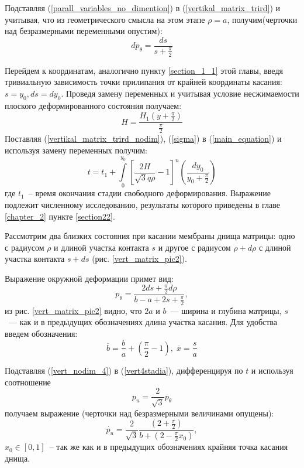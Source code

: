 Подставляя (\ref{parall_variables_no_dimention}) в (\ref{vertikal_matrix_trird}) и учитывая, что из геометрического смысла на этом этапе $\rho = a$, получим(черточки над безразмерными переменными опустим):
	\begin{equation}
	dp_\theta = \dfrac{ds}{s+\frac{\pi}{2}}
	\label{vertikal_matrix_trird_nodim}
	\end{equation}

Перейдем к координатам, аналогично пункту \ref{section_1_1} этой главы, введя тривиальную зависимость точки прилипания от крайней координаты касания: $s=y_0, ds = dy_0$.
Проведя замену переменных и учитывая условие несжимаемости плоского деформированного состояния получаем:
	\begin{equation}
	H=\dfrac{H_1(y+\frac{\pi}{2})}{\frac{\pi}{2}}
	\end{equation}
Поставляя (\ref{vertikal_matrix_trird_nodim}), (\ref{sigma}) в (\ref{main_equation}) и используя замену переменных получим:
\begin{equation}
t = t_1 + \int\limits_0^{y_0}\left[ \dfrac{2H}{\sqrt3 q \rho} -1\right]^n\left(\dfrac{dy_0}{y_0+\frac{\pi}{2}}\right)
\end{equation}
	где $t_1$~-- время окончания стадии свободного деформирования.   
Выражение подлежит численному исследованию, результаты которого приведены в главе \ref{chapter_2} пункте \ref{section22}.

	

	
	Рассмотрим два близких состояния при касании мембраны днища матрицы:
	одно  с радиусом $\rho$ и длиной участка контакта $s$ и другое с радиусом $\rho+d\rho$ с длиной участка контакта $s+ds$ (рис. \ref{vert_matrix_pic2}).
	
	Выражение окружной деформации примет вид:
	\begin{equation}
	p_\theta = \dfrac{2ds+\frac{\pi}{2}d\rho}{b-a+2s+\frac{\pi}{2}},
	\label{vert4stadia}
	\end{equation}
   из рис. \ref{vert_matrix_pic2} видно, что $2a$ и $b$~--- ширина и глубина матрицы, $s$~--- как и в предыдущих обозначениях длина участка касания. Для удобства введем обозначения:
   \begin{equation}
   \overline{b} = \dfrac{b}{a}+\left(\dfrac \pi 2 -1\right),\; \overline{x} = \dfrac{s}{a}
	\label{vert_nodim_4}
   \end{equation}
	   
	
    Подставляя (\ref{vert_nodim_4}) в (\ref{vert4stadia}), дифференцируя по $t$ 
    и используя соотношение 
    \begin{equation} 
    p_u=\frac{2}{\sqrt 3}p_\theta
	\end{equation}
     получаем выражение (черточки над безразмерными величинами опущены):
    \begin{equation}
    \dot{p_u} = \dfrac{2}{\sqrt 3}\dfrac{\left( 2+\frac{\pi}{2}\right)}{b+\left(2-\frac{\pi}{2}x_0\right)},
    \label{vert_nodim}
    \end{equation}
	$x_0 \in [0, 1]$~-- так же как и в предыдущих обозначениях крайняя точка касания днища.
	
